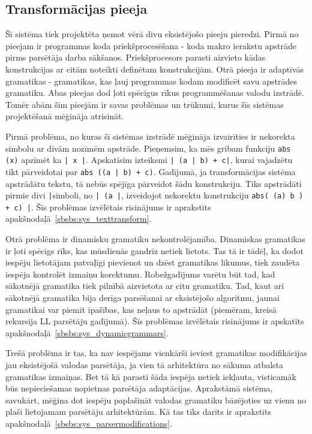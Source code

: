 \subsection{\label{sbs:sys_approach}Transformācijas pieeja}

Šī sistēma tiek projektēta ņemot vērā divu eksistējošo pieeju pieredzi. Pirmā no pieejam ir programmas koda priekšprocesēšana - koda makro ierakstu apstrāde pirms parsētāja darba sākšanos. Priekšprocesors parasti aizvieto kādas konstrukcijas ar citām noteikti definētam konstrukcijām. Otrā pieeja ir adaptīvās gramatikas - gramatikas, kas ļauj programmas kodam modificēt savu apstrādes gramatiku. Abas pieejas dod ļoti spēcīgus rīkus programmēšanas valodu izstrādē. Tomēr abām šīm pieejām ir savas problēmas un trūkumi, kurus šīs sistēmas projektēšanā mēģināja atrisināt. 

Pirmā problēma, no kuras šī sistēmas izstrādē mēģināja izvairīties ir nekorekta simbolu ar divām nozīmēm apstrāde. Pieņemsim, ka mēs gribam funkciju \verb|abs (x)| apzīmēt ka \verb/| x |/. Apskatīsim izteiksmi \verb/| (a | b) + c|/, kurai vajadzētu tikt pārveidotai par \verb/abs ((a | b) + c)/. Gadījumā, ja transformācijas sistēma apstrādātu tekstu, tā nebūs spējīga pārveidot šādu konstrukciju. Tiks apstrādāti pirmie divi \verb/|/simboli, no \verb/| (a |/, izveidojot nekorektu konstrukciju \verb/abs( (a) b ) + c) |/. Šīs problēmas izvēlētais risinājums ir aprakstīts apakšnodaļā~\ref{sbsbs:sys_texttransform}.

Otrā problēma ir dinamisku gramatiku nekontrolējamība. Dinamiskas gramatikas ir ļoti spēcīgs rīks, kas mūsdienās gandrīz netiek lietots. Tas tā ir tādēļ, ka dodot iespēju lietotājam patvaļīgi pievienot un dzēst gramatikas likumus, tiek zaudēta iespēja kontrolēt izmaiņu korektumu. Robežgadījums varētu būt tad, kad sākotnējā gramatika tiek pilnībā aizvietota ar citu gramatiku. Tad, kaut arī sākotnējā gramatika bija derīga parsēšanai ar eksistējošo algoritmu, jaunai gramatikai var piemīt īpašības, kas neļaus to apstrādāt (piemēram, kreisā rekursija LL parsētāju gadījumā). Šīs problēmas izvēlētais risinājums ir apskatīts apakšnodaļā~\ref{sbsbs:sys_dynamicgrammars}.

Trešā problēma ir tas, ka nav iespējams vienkārši ieviest gramatikas modifikācijas jau eksistējošā valodas parsētāja, ja vien tā arhitektūra no sākuma atbalsta gramatikas izmaiņas. Bet tā kā parasti šāda iespēja netiek iekļauta, visticamāk būs nepieciešamas nopietnas parsētāja adaptācijas. Aprakstāmā sistēma, savukārt, mēģina dot iespēju paplašināt valodas gramatiku bāzējoties uz vienu no plaši lietojamam parsētāju arhitektūrām. Kā tas tiks darīts ir aprakstīts apakšnodaļā~\ref{sbsbs:sys_parsermodifications}.

